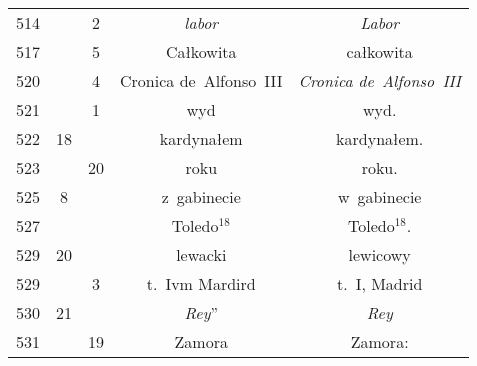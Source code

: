 \documentclass[a4paper,11pt]{article}
\begin{document}
\begin{center}
\begin{tabular}{|c|c|c|c|c|}
    514 & &  2 & \emph{labor} & \emph{Labor} \\
    517 & &  5 & Całkowita & całkowita \\
    520 & &  4 & Cronica de~Alfonso~III & \emph{Cronica de~Alfonso~III} \\
    521 & &  1 & wyd & wyd. \\
    522 & 18 & & kardynałem & kardynałem. \\
    523 & & 20 & roku & roku. \\
    525 &  8 & & z~gabinecie & w~gabinecie \\
    527 & & & Toledo$^{ 18 }$\tb{.} & Toledo$^{ 18 }$. \\
    529 & 20 & & lewacki & lewicowy \\
    529 & &  3 & t.~Ivm Mardird & t.~I, Madrid \\
    530 & 21 & & \emph{Rey}” & \emph{Rey} \\
    531 & & 19 & Zamora\tb{:} & Zamora: \\
    \hline
  \end{tabular}



\end{center}
\end{document}
